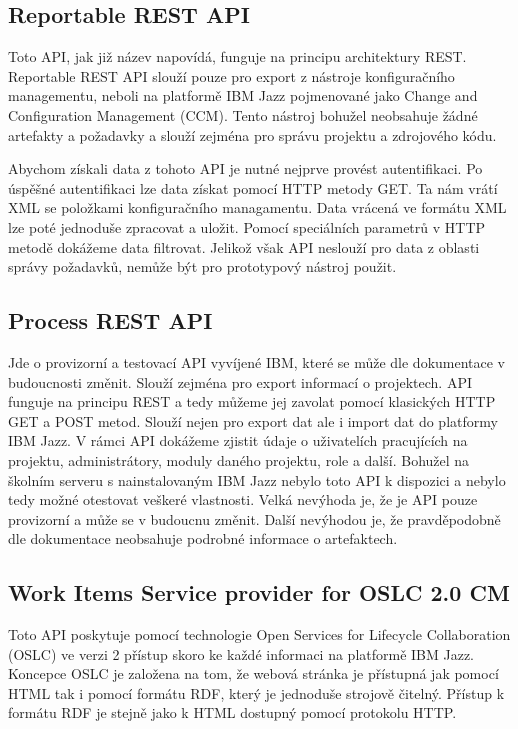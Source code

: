 \documentclass[czech,master]{diploma}
\begin{document}
\subsection{Reportable REST API}
Toto API, jak již název napovídá, funguje na principu architektury REST. Reportable REST API slouží pouze pro export z nástroje konfiguračního managementu, neboli na platformě IBM Jazz pojmenované jako Change and Configuration Management (CCM). Tento nástroj bohužel neobsahuje žádné artefakty a požadavky a slouží zejména pro správu projektu a zdrojového kódu.

Abychom získali data z tohoto API je nutné nejprve provést autentifikaci. Po úspěšné autentifikaci lze data získat pomocí HTTP metody GET. Ta nám vrátí XML se položkami konfiguračního managamentu. Data vrácená ve formátu XML lze poté jednoduše zpracovat a uložit. Pomocí speciálních parametrů v HTTP metodě dokážeme data filtrovat. Jelikož však API neslouží pro data z oblasti správy požadavků, nemůže být pro prototypový nástroj použit.

\subsection{Process REST API}
Jde o provizorní a testovací API vyvíjené IBM, které se může dle dokumentace v budoucnosti změnit. Slouží zejména pro export informací o projektech. API funguje na principu REST a tedy můžeme jej zavolat pomocí klasických HTTP GET a POST metod. Slouží nejen pro export dat ale i import dat do platformy IBM Jazz. V rámci API dokážeme zjistit údaje o uživatelích pracujících na projektu, administrátory, moduly daného projektu, role a další. Bohužel na školním serveru s nainstalovaným IBM Jazz nebylo toto API k dispozici a nebylo tedy možné otestovat veškeré vlastnosti. Velká nevýhoda je, že je API pouze provizorní a může se v budoucnu změnit. Další nevýhodou je, že pravděpodobně dle dokumentace neobsahuje podrobné informace o artefaktech.

\subsection{Work Items Service provider for OSLC 2.0 CM}
Toto API poskytuje pomocí technologie Open Services for Lifecycle Collaboration (OSLC) ve verzi 2 přístup skoro ke každé informaci na platformě IBM Jazz. Koncepce OSLC je založena na tom, že webová stránka je přístupná jak pomocí HTML tak i pomocí formátu RDF, který je jednoduše strojově čitelný. Přístup k formátu RDF je stejně jako k HTML dostupný pomocí protokolu HTTP.
\end{document}
